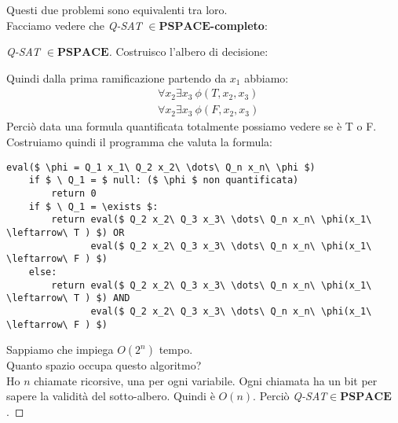 \documentclass[a4paper]{article}
\theoremstyle{definition}
\newcommand{\pspace}{\mathbf{PSPACE}}
\begin{document}
	 \noindent
	 Questi due problemi sono equivalenti tra loro.\\
	 Facciamo vedere che \textit{Q-SAT} $ \in \pspace$\textbf{-completo}:
	 
	 \begin{proof}[\textit{Q-SAT} $ \in \pspace$]
	 	Costruisco l'albero di decisione:
	 	\begin{figure}[h!]
	 		\centering
	 	\end{figure}
	 	
	 	Quindi dalla prima ramificazione partendo da $ x_1 $ abbiamo:
	 	\begin{align*}
		 	&\forall x_2\exists x_3\ \phi (T, x_2, x_3) \\
		 	&\forall x_2\exists x_3\ \phi (F, x_2, x_3)
	 	\end{align*}
		 Perciò data una formula quantificata totalmente possiamo vedere se è T o F. Costruiamo quindi il programma che valuta la formula:
		 \begin{lstlisting}[mathescape=true, frame=tb, basicstyle=\small\ttfamily, caption={Algoritmo che valuta la formula quantificata $ \phi $}]
eval($ \phi = Q_1 x_1\ Q_2 x_2\ \dots\ Q_n x_n\ \phi $)
	if $ \ Q_1 = $ null: ($ \phi $ non quantificata)
		return 0
	if $ \ Q_1 = \exists $:
		return eval($ Q_2 x_2\ Q_3 x_3\ \dots\ Q_n x_n\ \phi(x_1\ \leftarrow\ T ) $) OR
			   eval($ Q_2 x_2\ Q_3 x_3\ \dots\ Q_n x_n\ \phi(x_1\ \leftarrow\ F ) $)
	else:
		return eval($ Q_2 x_2\ Q_3 x_3\ \dots\ Q_n x_n\ \phi(x_1\ \leftarrow\ T ) $) AND
			   eval($ Q_2 x_2\ Q_3 x_3\ \dots\ Q_n x_n\ \phi(x_1\ \leftarrow\ F ) $)
		 \end{lstlisting}
		 
		 Sappiamo che impiega $ O(2^n) $ tempo.\\
		 Quanto spazio occupa questo algoritmo?\\
		 Ho $ n $ chiamate ricorsive, una per ogni variabile. Ogni chiamata ha un bit per sapere la validità del sotto-albero. Quindi è $ O(n) $. Perciò \textit{Q-SAT}$ \in\pspace $.
	 \end{proof}
	 
\end{document}
